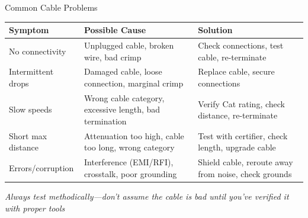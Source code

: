\documentclass[aspectratio=169]{beamer}
\begin{document}
\begin{frame}{Common Cable Problems}
    \begin{table}
        \centering
        \small
        \begin{tabular}{|p{3cm}|p{3.5cm}|p{3.5cm}|}
            \hline
            \rowcolor{networkblue!20}
            \textbf{Symptom} & \textbf{Possible Cause} & \textbf{Solution} \\
            \hline
            No connectivity & Unplugged cable, broken wire, bad crimp & Check connections, test cable, re-terminate \\
            \hline
            Intermittent drops & Damaged cable, loose connection, marginal crimp & Replace cable, secure connections \\
            \hline
            Slow speeds & Wrong cable category, excessive length, bad termination & Verify Cat rating, check distance, re-terminate \\
            \hline
            Short max distance & Attenuation too high, cable too long, wrong category & Test with certifier, check length, upgrade cable \\
            \hline
            Errors/corruption & Interference (EMI/RFI), crosstalk, poor grounding & Shield cable, reroute away from noise, check grounds \\
            \hline
        \end{tabular}
    \end{table}
    
    \vspace{0.2cm}
    \small{\textit{Always test methodically---don't assume the cable is bad until you've verified it with proper tools}}
\end{frame}
\end{document}
